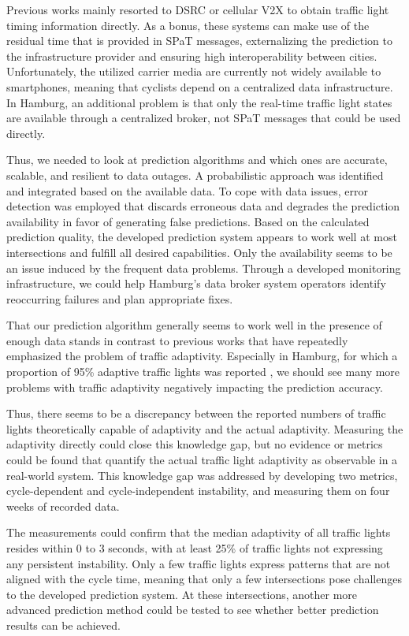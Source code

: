 Previous works mainly resorted to DSRC or cellular V2X to obtain traffic light timing information directly. As a bonus, these systems can make use of the residual time that is provided in SPaT messages, externalizing the prediction to the infrastructure provider and ensuring high interoperability between cities. Unfortunately, the utilized carrier media are currently not widely available to smartphones, meaning that cyclists depend on a centralized data infrastructure. In Hamburg, an additional problem is that only the real-time traffic light states are available through a centralized broker, not SPaT messages that could be used directly. 

Thus, we needed to look at prediction algorithms and which ones are accurate, scalable, and resilient to data outages. A probabilistic approach was identified and integrated based on the available data. To cope with data issues, error detection was employed that discards erroneous data and degrades the prediction availability in favor of generating false predictions. Based on the calculated prediction quality, the developed prediction system appears to work well at most intersections and fulfill all desired capabilities. Only the availability seems to be an issue induced by the frequent data problems. Through a developed monitoring infrastructure, we could help Hamburg's data broker system operators identify reoccurring failures and plan appropriate fixes. 

That our prediction algorithm generally seems to work well in the presence of enough data stands in contrast to previous works that have repeatedly emphasized the problem of traffic adaptivity. Especially in Hamburg, for which a proportion of 95\% adaptive traffic lights was reported \cite{bodenheimer_enabling_2014}, we should see many more problems with traffic adaptivity negatively impacting the prediction accuracy. 

Thus, there seems to be a discrepancy between the reported numbers of traffic lights theoretically capable of adaptivity and the actual adaptivity. Measuring the adaptivity directly could close this knowledge gap, but no evidence or metrics could be found that quantify the actual traffic light adaptivity as observable in a real-world system. This knowledge gap was addressed by developing two metrics, cycle-dependent and cycle-independent instability, and measuring them on four weeks of recorded data.

The measurements could confirm that the median adaptivity of all traffic lights resides within 0 to 3 seconds, with at least 25\% of traffic lights not expressing any persistent instability. Only a few traffic lights express patterns that are not aligned with the cycle time, meaning that only a few intersections pose challenges to the developed prediction system. At these intersections, another more advanced prediction method could be tested to see whether better prediction results can be achieved.

